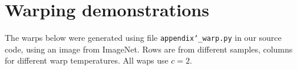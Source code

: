 

\section{Warping demonstrations}\label{sec:appendix-warping}
The warps below were generated using file \texttt{appendix\char`_warp.py} in our source code, using an image from ImageNet. Rows are from different samples, columns for different warp temperatures. All waps use $c=2$.

